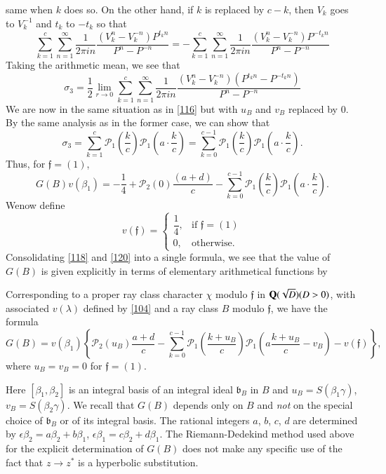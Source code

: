same when $k$ does so. On the other hand, if $k$ is replaced by $c-k$,
then $V_{k}$ goes to $V^{-1}_{k}$ and $t_{k}$ to $-t_{k}$ so that
$$
\sum^{c}_{k=1}\sum^{\infty}_{n=1}\frac{1}{2\pi
  in}\frac{(V^{n}_{k}-V^{-n}_{k})P^{t_{k}n}}{P^{n}-P^{-n}}=-\sum^{c}_{k=1}\sum^{\infty}_{n=1}\frac{1}{2\pi
  in}\frac{(V^{n}_{k}-V^{-n}_{k})P^{-t_{k}n}}{P^{n}-P^{-n}}
$$
Taking the arithmetic mean, we see that
$$
\sigma_{3}=\frac{1}{2}\lim\limits_{r\to
  0}\sum^{c}_{k=1}\sum^{\infty}_{n=1}\frac{1}{2\pi
  in}\frac{(V^{n}_{k}-V^{-n}_{k})(P^{t_{k}n}-P^{-t_{k}n})}{P^{n}-P^{-n}} 
$$
We are now in the same situation as in \eqref{116} but with $u_{B}$
and $v_{B}$ replaced by $0$. By the same analysis as in the former
case, we can show that
$$
\sigma_{3}=\sum^{c}_{k=1}\mathscr{P}_{1}\left(\frac{k}{c}\right)\mathscr{P}_{1}\left(a\cdot
\frac{k}{c}\right)=\sum^{c-1}_{k=0}\mathscr{P}_{1}\left(\frac{k}{c}\right)\mathscr{P}_{1}\left(a\cdot
\frac{k}{c}\right).
$$
Thus, for $\mathfrak{f}=(1)$,
\begin{equation*}
G(B)v(\beta_{1})=-\frac{1}{4}+\mathscr{P}_{2}(0)\frac{(a+d)}{c}-\sum^{c-1}_{k=0}\mathscr{P}_{1}\left(\frac{k}{c}\right)\mathscr{P}_{1}\left(a\cdot
\frac{k}{c}\right).\tag{120}\label{120}
\end{equation*}
We\pageoriginale now define
$$
v(\mathfrak{f})=
\begin{cases}
\dfrac{1}{4}, & \text{if } \mathfrak{f}=(1)\\
0,  & \text{otherwise.}
\end{cases}
$$
Consolidating \eqref{118} and \eqref{120} into a single formula, we
see that the value of $G(B)$ is given explicitly in terms of
elementary arithmetical functions by 

\begin{thm}\label{thm13}
Corresponding to a proper ray class character $\chi$ modulo
$\mathfrak{f}$ in $\mathbf{Q}(\sqrt{D})(D>0)$, with associated $v(\lambda)$
defined by \eqref{104} and a ray class $B$ modulo $\mathfrak{f}$, we
have the formula
{\fontsize{10}{12}\selectfont
\begin{equation*}
G(B)=v(\beta_{1})\left\{\mathscr{P}_{2}(u_{B})\frac{a+d}{c}-\sum^{c-1}_{k=0}\mathscr{P}_{1}\left(\frac{k+u_{B}}{c}\right)\mathscr{P}_{1}\left(a\frac{k+u_{B}}{c}-v_{B}\right)-v(\mathfrak{f})\right\},\tag{121}\label{121} 
\end{equation*}}
where $u_{B}=v_{B}=0$ for $\mathfrak{f}=(1)$.
\end{thm}

\begin{note*}
Here $[\beta_{1},\beta_{2}]$ is an integral basis of an integral ideal
$\mathfrak{b}_{B}$ in $B$ and $u_{B}=S(\beta_{1}\gamma)$,
$v_{B}=S(\beta_{2}\gamma)$. We recall that $G(B)$ depends only on $B$
and {\em not} on the special choice of $\mathfrak{b}_{B}$ or of its
integral basis. The rational integers $a$, $b$, $c$, $d$ are
determined by $\epsilon\beta_{2}=a\beta_{2}+b\beta_{1}$,
$\epsilon\beta_{1}=c\beta_{2}+d\beta_{1}$. The Riemann-Dedekind method
used above for the explicit determination of $G(B)$ does not make any
specific use of the fact that $z\to z^{\ast}$ is a hyperbolic
substitution.
\end{note*}

